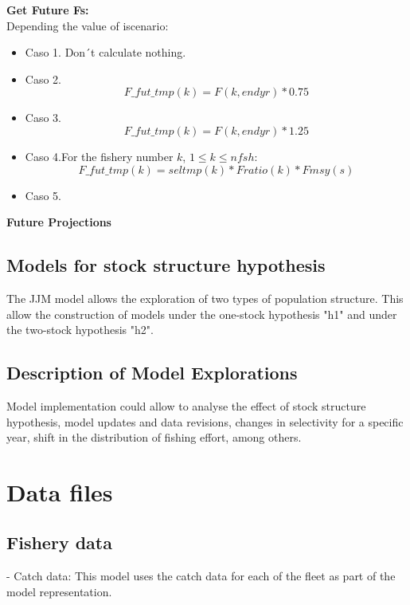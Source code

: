 \documentclass{article}
\begin{document}
\textbf{Get Future Fs:}\\
Depending the value of iscenario:
\begin{itemize}
    \item Caso 1. Don´t calculate nothing.
    \item Caso 2.  \begin{equation}
        F\_fut\_tmp(k) = F(k,endyr)*0.75
    \end{equation}
    \item Caso 3.  \begin{equation}
        F\_fut\_tmp(k) = F(k,endyr)*1.25
    \end{equation}
    \item Caso 4.For the fishery number $k$, $1\leq k \leq nfsh$:
    \begin{equation}
        F\_fut\_tmp(k)=seltmp(k)*Fratio(k)*Fmsy(s)
    \end{equation}
    \item Caso 5.
\end{itemize}
\textbf{Future Projections}
\subsection{Models for stock structure hypothesis}

The JJM model allows the exploration of two types of population structure. This allow the construction of models under the one-stock hypothesis "h1" and under the two-stock hypothesis "h2".

\subsection{Description of Model Explorations}

Model implementation could allow to analyse the effect of stock structure hypothesis, model updates and data revisions, changes in selectivity for a specific year, shift in the distribution of fishing effort, among others. 

\section{Data files}

\subsection{Fishery data}

- Catch data: This model uses the catch data for each of the fleet as part of the model representation.
\end{document}
